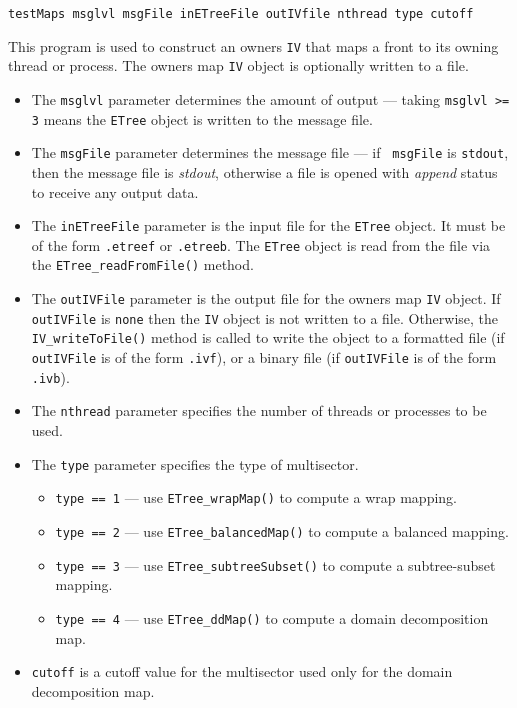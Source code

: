 \begin{enumerate}
\begin{verbatim}
testMaps msglvl msgFile inETreeFile outIVfile nthread type cutoff
\end{verbatim}
This program is used to construct an owners {\tt IV} that maps a
front to its owning thread or process.
The owners map {\tt IV} object is optionally written to a file.
\par
\begin{itemize}
\item
The {\tt msglvl} parameter determines the amount of output ---
taking {\tt msglvl >= 3} means the {\tt ETree} object is written
to the message file.
\item
The {\tt msgFile} parameter determines the message file --- if {\tt
msgFile} is {\tt stdout}, then the message file is {\it stdout},
otherwise a file is opened with {\it append} status to receive any
output data.
\item
The {\tt inETreeFile} parameter is the input file for the {\tt ETree}
object. It must be of the form {\tt *.etreef} or {\tt *.etreeb}.
The {\tt ETree} object is read from the file via the
{\tt ETree\_readFromFile()} method.
\item
The {\tt outIVFile} parameter is the output file for the 
owners map {\tt IV} object. 
If {\tt outIVFile} is {\tt none} then the {\tt IV} object is not
written to a file. 
Otherwise, the {\tt IV\_writeToFile()} method is called to write
the object to a formatted file (if {\tt outIVFile} 
is of the form {\tt *.ivf}), or a binary file 
(if {\tt outIVFile} is of the form {\tt *.ivb}).
\item
The {\tt nthread} parameter specifies the number of threads or
processes to be used.
\item
The {\tt type} parameter specifies the type of multisector.
\begin{itemize}
\item
{\tt type == 1} 
--- use {\tt ETree\_wrapMap()} to compute a wrap mapping.
\item
{\tt type == 2} 
--- use {\tt ETree\_balancedMap()} to compute a balanced mapping.
\item
{\tt type == 3} 
--- use {\tt ETree\_subtreeSubset()} 
    to compute a subtree-subset mapping.
\item
{\tt type == 4} 
--- use {\tt ETree\_ddMap()} to compute a domain decomposition map.
\end{itemize}
\item
{\tt cutoff} is a cutoff value for the multisector used only for
the domain decomposition map.

\end{itemize}
\end{enumerate}
